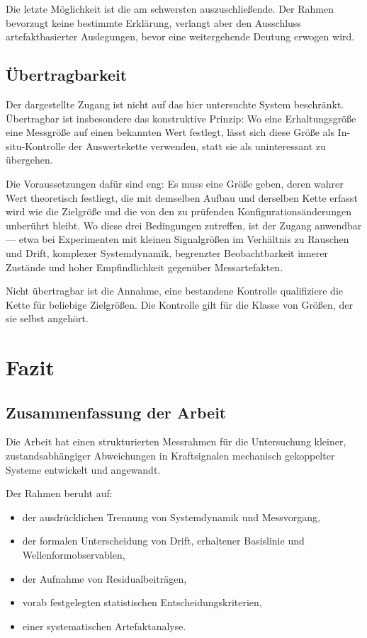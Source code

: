 \documentclass[12pt,a4paper]{report}
\begin{document}
Die letzte Möglichkeit ist die am schwersten auszuschließende. Der Rahmen
bevorzugt keine bestimmte Erklärung, verlangt aber den Ausschluss
artefaktbasierter Auslegungen, bevor eine weitergehende Deutung erwogen
wird.

\section{Übertragbarkeit}

Der dargestellte Zugang ist nicht auf das hier untersuchte System
beschränkt. Übertragbar ist insbesondere das konstruktive Prinzip: Wo
eine Erhaltungsgröße eine Messgröße auf einen bekannten Wert festlegt,
lässt sich diese Größe als In-situ-Kontrolle der Auswertekette verwenden,
statt sie als uninteressant zu übergehen.

Die Voraussetzungen dafür sind eng: Es muss eine Größe geben, deren
wahrer Wert theoretisch festliegt, die mit demselben Aufbau und derselben
Kette erfasst wird wie die Zielgröße und die von den zu prüfenden
Konfigurationsänderungen unberührt bleibt. Wo diese drei Bedingungen
zutreffen, ist der Zugang anwendbar --- etwa bei Experimenten mit
kleinen Signalgrößen im Verhältnis zu Rauschen und Drift, komplexer
Systemdynamik, begrenzter Beobachtbarkeit innerer Zustände und hoher
Empfindlichkeit gegenüber Messartefakten.

Nicht übertragbar ist die Annahme, eine bestandene Kontrolle qualifiziere
die Kette für beliebige Zielgrößen. Die Kontrolle gilt für die Klasse von
Größen, der sie selbst angehört.



\chapter{Fazit}
\label{chap:fazit}

\section{Zusammenfassung der Arbeit}

Die Arbeit hat einen strukturierten Messrahmen für die Untersuchung
kleiner, zustandsabhängiger Abweichungen in Kraftsignalen mechanisch
gekoppelter Systeme entwickelt und angewandt.

Der Rahmen beruht auf:

\begin{itemize}
\item der ausdrücklichen Trennung von Systemdynamik und Messvorgang,
\item der formalen Unterscheidung von Drift, erhaltener Basislinie und
      Wellenformobservablen,
\item der Aufnahme von Residualbeiträgen,
\item vorab festgelegten statistischen Entscheidungskriterien,
\item einer systematischen Artefaktanalyse.
\end{itemize}
\end{document}
